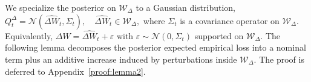 \documentclass{article}
\theoremstyle{plain}
\theoremstyle{definition}
\theoremstyle{remark}
\begin{document}
We specialize the posterior on $\mathcal{W}_\Delta$ to a Gaussian distribution,
$
Q_t^\Delta = \mathcal{N}(\hat{\Delta W}_t,\Sigma_t),
\quad
\hat{\Delta W}_t \in \mathcal{W}_\Delta,
$
where $\Sigma_t$ is a covariance operator on $\mathcal{W}_\Delta$.
Equivalently, $\Delta W = \hat{\Delta W}_t + \varepsilon$ with $\varepsilon\sim\mathcal{N}(0,\Sigma_t)$ supported on $\mathcal{W}_\Delta$.
The following lemma decomposes the posterior expected empirical loss into a nominal term plus an additive increase induced by perturbations inside $\mathcal{W}_\Delta$.
The proof is deferred to Appendix~\ref{proof:lemma2}.
\end{document}
